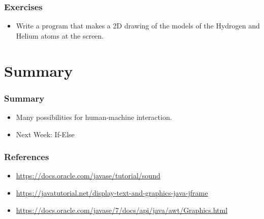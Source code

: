 \documentclass{beamer}
\begin{document}
	\begin{frame}
		\frametitle{Exercises}
		\begin{itemize}
			\item Write a program that makes a 2D drawing of the models of the Hydrogen and Helium atoms at the screen.
		\end{itemize}
	\end{frame}
	
	\section{Summary}
	
	\begin{frame}
		\frametitle{Summary}
		\begin{itemize}
			\item Many possibilities for human-machine interaction.
			\item Next Week: If-Else
		\end{itemize}
	\end{frame}

	\begin{frame}
		\frametitle{References}
		\begin{itemize}
			\item \url{https://docs.oracle.com/javase/tutorial/sound}
			\item \url{https://javatutorial.net/display-text-and-graphics-java-jframe}
			\item \url{https://docs.oracle.com/javase/7/docs/api/java/awt/Graphics.html} 
		\end{itemize}
		
	\end{frame}
\end{document}
